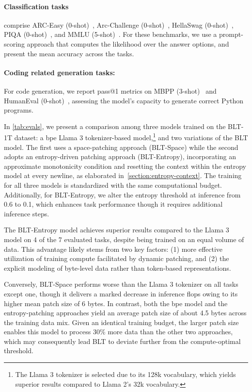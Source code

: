 \paragraph{Classification tasks} comprise ARC-Easy (0-shot)~\citep{Eval_ARC}, Arc-Challenge (0-shot)~\citep{Eval_ARC}, HellaSwag (0-shot)~\citep{Eval_hellaswag}, PIQA (0-shot)~\citep{Eval_piqa}, and MMLU (5-shot)~\citep{hendrycks2020measuring}. For these benchmarks, we use a prompt-scoring approach that computes the likelihood over the answer options, and present the mean accuracy across the tasks.
\paragraph{Coding related generation tasks:} For code generation, we report pass@1 metrics on MBPP (3-shot)~\citep{Eval_MBPP} and HumanEval (0-shot)~\citep{Eval_HumanEval}, assessing the model’s capacity to generate correct Python programs.

In \autoref{tab:evals}, we present a comparison among three models trained on the {\textsc BLT}-1T dataset: a bpe Llama 3 tokenizer-based model,\footnote{The Llama 3 tokenizer is selected due to its 128k vocabulary, which yields superior results compared to Llama 2's 32k vocabulary.} and two variations of the {\textsc BLT} model. The first uses a space-patching approach ({\textsc BLT}-Space) while the second adopts an entropy-driven patching approach ({\textsc BLT}-Entropy), incorporating an approximate monotonicity condition and resetting the context within the entropy model at every newline, as elaborated in~\autoref{section:entropy-context}. The training for all three models is standardized with the same computational budget. Additionally, for {\textsc BLT}-Entropy, we alter the entropy threshold at inference from 0.6 to 0.1, which enhances task performance though it requires additional inference steps.

The {\textsc BLT}-Entropy model achieves superior results compared to the Llama 3 model on 4 of the 7 evaluated tasks, despite being trained on an equal volume of data. This advantage likely stems from two key factors: (1) more effective utilization of training compute facilitated by dynamic patching, and (2) the explicit modeling of byte-level data rather than token-based representations.

Conversely, {\textsc BLT}-Space performs worse than the Llama 3 tokenizer on all tasks except one, though it delivers a marked decrease in inference flops owing to its higher mean patch size of 6 bytes. In contrast, both the bpe model and the entropy-patching approaches yield an average patch size of about 4.5 bytes across the training data mix. Given an identical training budget, the larger patch size enables this model to process 30\% more data than the other two approaches, which may consequently lead {\textsc BLT} to deviate further from the compute-optimal threshold.

